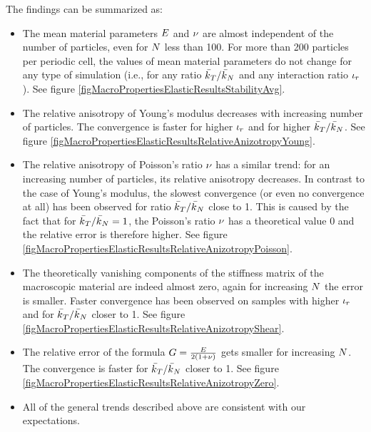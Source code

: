 The findings can be summarized as:
\begin{itemize}
	\item
		The mean material parameters $E$ and $\nu$ are almost independent of the number of particles,
		even for $N$ less than 100.
		For more than 200 particles per periodic cell, the values of mean material parameters do not change for any type of simulation (i.e., for any ratio $\linkStiffnessShear/\linkStiffnessNormal$ and any interaction ratio $\iota_r$).
		See figure \ref{figMacroPropertiesElasticResultsStabilityAvg}.
	\item
		The relative anisotropy of Young's modulus decreases with increasing number of particles.
		The convergence is faster for higher $\iota_r$ and for higher $\linkStiffnessShear/\linkStiffnessNormal$.
		See figure \ref{figMacroPropertiesElasticResultsRelativeAnizotropyYoung}.
	\item
		The relative anisotropy of Poisson's ratio $\nu$ has a similar trend:
		for an increasing number of particles, its relative anisotropy decreases.
		In contrast to the case of Young's modulus, the slowest convergence (or even no convergence at all) has been observed for ratio
		$\linkStiffnessShear/\linkStiffnessNormal$ close to 1.
		This is caused by the fact that for $\linkStiffnessShear/\linkStiffnessNormal=1$,
		the Poisson's ratio $\nu$ has a theoretical value 0 and the relative error is therefore higher.
		See figure \ref{figMacroPropertiesElasticResultsRelativeAnizotropyPoisson}.
	\item
		The theoretically vanishing components of the stiffness matrix of the macroscopic material are indeed almost zero,
		again for increasing $N$ the error is smaller.
		Faster convergence has been observed on samples with higher $\iota_r$ and for
		$\linkStiffnessShear/\linkStiffnessNormal$ closer to 1.
		See figure \ref{figMacroPropertiesElasticResultsRelativeAnizotropyShear}.
	\item
		The relative error of the formula
		$G=\frac{E}{2(1+\nu)}$
		gets smaller for increasing $N$.
		The convergence is faster for $\linkStiffnessShear/\linkStiffnessNormal$ closer to 1.
		See figure \ref{figMacroPropertiesElasticResultsRelativeAnizotropyZero}.
	\item
		All of the general trends described above are consistent with our expectations.
\end{itemize}

